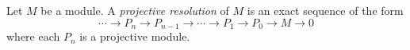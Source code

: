 \documentclass{article}
\begin{document}
Let $M$ be a module.  A {\it projective resolution} of $M$
is an exact sequence of the form
$$\cdots \to P_n \to P_{n-1} \to \cdots \to P_1 \to P_0 \to M \to 0$$
where each $P_n$ is a projective module.
\end{document}
